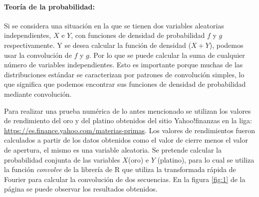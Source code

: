 \documentclass{article}
\begin{document}
\paragraph{Teoría de la probabilidad:} Si se considera una situación en la que se tienen dos variables aleatorias independientes,  $X$ e $Y$, con funciones de densidad de probabilidad $f$ y $g$ respectivamente. Y se desea calcular la función de densidad ($X+Y$), podemos usar la convolución de $f$ y $g$. Por lo que se puede calcular la suma de cualquier número de variables independientes. Esto es importante porque muchas de las distribuciones estándar se caracterizan por patrones de convolución simples, lo que significa que podemos encontrar sus funciones de densidad de probabilidad mediante convolución.

Para realizar una prueba numérica de lo antes mencionado se utilizan los valores de rendimiento del oro y del platino obtenidos del sitio Yahoo!finanzas en la liga: \href{https://es.finance.yahoo.com/materias-primas}{https://es.finance.yahoo.com/materias-primas}. Los valores de rendimientos fueron calculados a partir de los datos obtenidos como el valor de cierre menos el valor de apertura, el mismo es una variable aleatoria. Se pretende calcular la probabilidad conjunta de las variables $X$(oro) e $Y$ (platino), para lo cual se utiliza la función \textit{convolve} de la librería de R que utiliza la transformada rápida de Fourier para calcular la convolución de dos secuencias. En la figura \ref{fig:1} de la página \pageref{fig:1} se puede observar los resultados obtenidos. 
\end{document}
